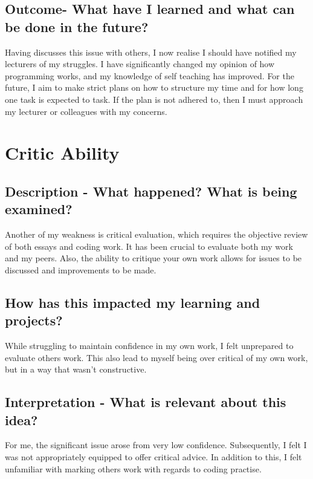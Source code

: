 \documentclass{scrartcl}
\begin{document}
\subsection{Outcome- What have I learned and what can be done in the future?}

Having discusses this issue with others, I now realise I should have notified my lecturers of my struggles. I have significantly changed my opinion of how programming works, and my knowledge of self teaching has improved. For the future, I aim to make strict plans on how to structure my time and for how long one task is expected to task. If the plan is not adhered to, then I must approach my lecturer or colleagues with my concerns.


\section{Critic Ability}

\subsection{Description - What happened? What is being examined?}

Another of my weakness is critical evaluation, which requires the objective review of both essays and coding work. It has been crucial to evaluate both my work and my peers. Also, the ability to critique your own work allows for issues to be discussed and improvements to be made.

\subsection{How has this impacted my learning and projects?}

While struggling to maintain confidence in my own work, I felt unprepared to evaluate others work. This also lead to myself being over critical of my own work, but in a way that wasn't constructive.

\subsection{Interpretation - What is relevant about this idea?}

For me, the significant issue arose from very low confidence. Subsequently, I felt I was not appropriately equipped to offer critical advice. In addition to this, I felt unfamiliar with marking others work with regards to coding practise.
\end{document}
